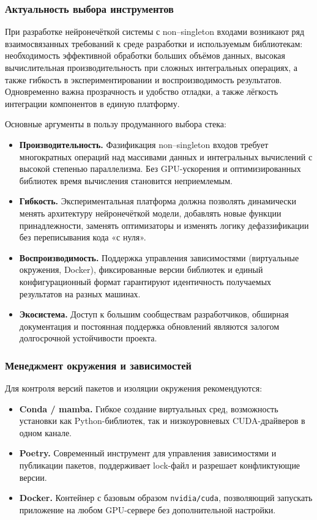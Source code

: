 \subsubsection{Актуальность выбора инструментов}
\label{subsubsec:why_tools}

При разработке нейронечёткой системы с non–singleton входами возникают
ряд взаимосвязанных требований к среде разработки и используемым библиотекам:
необходимость эффективной обработки больших объёмов данных,
высокая вычислительная производительность при сложных интегральных операциях,
а также гибкость в экспериментировании и воспроизводимость результатов.
Одновременно важна прозрачность и удобство отладки, а также лёгкость
интеграции компонентов в единую платформу.

\medskip

\noindent Основные аргументы в пользу продуманного выбора стека:
\begin{itemize}
  \item \textbf{Производительность.} Фазификация non–singleton входов
        требует многократных операций над массивами данных и
        интегральных вычислений с высокой степенью параллелизма.
        Без GPU-ускорения и оптимизированных библиотек
        время вычисления становится неприемлемым.
  \item \textbf{Гибкость.} Экспериментальная платформа должна
        позволять динамически менять архитектуру нейронечёткой модели,
        добавлять новые функции принадлежности, заменять оптимизаторы
        и изменять логику дефаззификации без переписывания кода «с нуля».
  \item \textbf{Воспроизводимость.} Поддержка управления зависимостями
        (виртуальные окружения, Docker), фиксированные версии библиотек
        и единый конфигурационный формат гарантируют
        идентичность получаемых результатов на разных машинах.
  \item \textbf{Экосистема.} Доступ к большим сообществам разработчиков,
        обширная документация и постоянная поддержка обновлений
        являются залогом долгосрочной устойчивости проекта.
\end{itemize}

\subsubsection{Менеджмент окружения и зависимостей}

Для контроля версий пакетов и изоляции окружения рекомендуются:
\begin{itemize}
  \item \textbf{Conda / mamba.} Гибкое создание виртуальных сред,
        возможность установки как Python-библиотек, так и
        низкоуровневых CUDA-драйверов в одном канале.
  \item \textbf{Poetry.} Современный инструмент для управления
        зависимостями и публикации пакетов, поддерживает lock-файл
        и разрешает конфликтующие версии.
  \item \textbf{Docker.} Контейнер с базовым образом \verb|nvidia/cuda|,
        позволяющий запускать приложение на любом GPU-сервере
        без дополнительной настройки.
\end{itemize}

